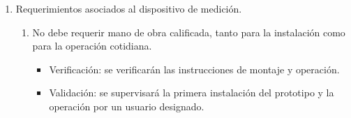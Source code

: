 \documentclass[
11pt, %
]{charter}
\begin{document}
%
\begin{enumerate}
	\item Requerimientos asociados al dispositivo de medición.
		\begin{enumerate}
			\item No debe requerir mano de obra calificada, tanto para la instalación como para la operación cotidiana.
			\begin{itemize}
				\item Verificación: se verificarán las instrucciones de montaje y operación.
				\item Validación: se supervisará la primera instalación del prototipo y la operación por un usuario designado.
			\end{itemize}


\end{enumerate}
\end{enumerate}
\end{document}
